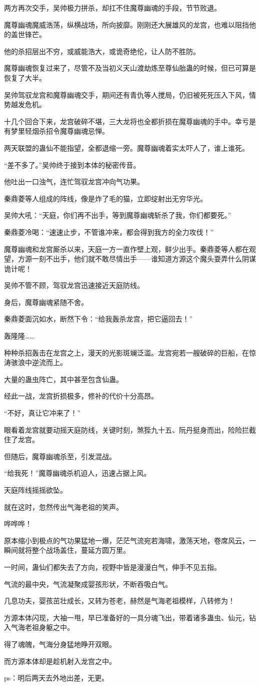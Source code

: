 \begin{this_body}
两方再次交手，吴帅极力拼杀，却扛不住魔尊幽魂的手段，节节败退。

魔尊幽魂魔威浩荡，纵横战场，所向披靡。刚刚还大展雄风的龙宫，也难以阻挡他的盖世锋芒。

他的杀招层出不穷，或威能浩大，或诡奇绝伦，让人防不胜防。

魔尊幽魂恢复过来了，尽管不及当初义天山渡劫炼至尊仙胎蛊的时候，但已可算是恢复了大半。

吴帅驾驭龙宫和魔尊幽魂交手，期间还有青仇等人搅局，仍旧被死死压入下风，情势越发危机。

十几个回合下来，龙宫破碎不堪，三大龙将也全都折损在魔尊幽魂的手中。幸亏是有梦里轻烟杀招令魔尊幽魂忌惮。

两天联盟的蛊仙不能指望，全都退缩一旁。魔尊幽魂着实太吓人了，谁上谁死。

“差不多了。”吴帅终于接到本体的秘密传音。

他吐出一口浊气，连忙驾驭龙宫冲向气功果。

秦鼎菱等人组成的阵线，像是炸了毛的猫，立即绽射出无穷华光。

吴帅大吼：“天庭，你们再不出手，等到魔尊幽魂斩杀了我，你们都要死。”

秦鼎菱冷喝：“速速止步，不管谁冲来，都会得到我方的全力攻伐！”

魔尊幽魂和龙宫厮杀以来，天庭一方一直作壁上观，鲜少出手。秦鼎菱等人都在观望，方源一刻不出手，他们就不敢尽情出手——谁知道方源这个魔头耍弄什么阴谋诡计呢！

吴帅不管不顾，驾驭龙宫迅速接近天庭防线。

身后，魔尊幽魂紧随不舍。

秦鼎菱面沉如水，断然下令：“给我轰杀龙宫，把它逼回去！”

轰隆隆……

种种杀招轰击在龙宫之上，漫天的光影斑斓泛滥。龙宫宛若一艘破碎的巨船，在惊涛骇浪中逆流而上。

大量的蛊虫阵亡，其中甚至包含仙蛊。

经此一战，龙宫折损极多，修补的代价十分高昂。

“不好，真让它冲来了！”

眼看着龙宫就要动摇天庭防线，关键时刻，煞狴九十五、阮丹挺身而出，险险拦截住了龙宫。

但随后，魔尊幽魂杀至，引发混战。

“给我死！”魔尊幽魂杀机迫人，迅速占据上风。

天庭阵线摇摇欲坠。

就在这时，忽然传出气海老祖的笑声。

哗哗哗！

原本缩小到极点的气功果猛地一爆，茫茫气流宛若海啸，激荡天地，卷席风云，一瞬间就将整个战场盖住，蔓延方圆万里。

一时间，蛊仙们都失去了方向，视野中皆是漫漫白气，伸手不见五指。

气流的最中央，气流凝聚成婴孩形状，不断吞吸白气。

几息功夫，婴孩茁壮成长，又转为苍老，赫然是气海老祖模样，八转修为！

方源本体闪现，大袖一甩，早已准备好的一具分魂飞出，带着诸多蛊虫、仙元，钻入气海老祖身躯之中。

得了魂魄，气海分身猛地睁开双眼。

而方源本体却是趁机射入龙宫之中。

ps：明后两天去外地出差，无更。

\end{this_body}

